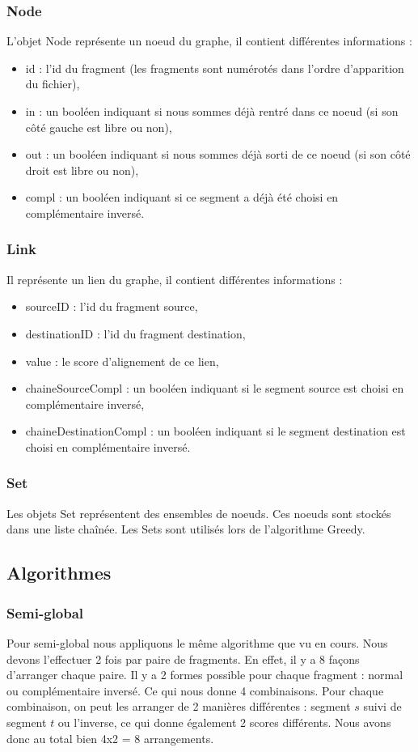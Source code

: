 \documentclass{article}
\begin{document}
\subsubsection{Node}
L'objet Node représente un noeud du graphe, il contient différentes informations :
\begin{itemize}
\item id : l'id du fragment (les fragments sont numérotés dans l'ordre d'apparition du fichier),
\item in : un booléen indiquant si nous sommes déjà rentré dans ce noeud (si son côté gauche est libre ou non),
\item out : un booléen indiquant si nous sommes déjà sorti de ce noeud (si son côté droit est libre ou non),
\item compl : un booléen indiquant si ce segment a déjà été choisi en complémentaire inversé.
\end{itemize}

\subsubsection{Link}
Il représente un lien du graphe, il contient différentes informations :
\begin{itemize}
\item sourceID : l'id du fragment source,
\item destinationID : l'id du fragment destination,
\item value : le score d'alignement de ce lien,
\item chaineSourceCompl : un booléen indiquant si le segment source est choisi en complémentaire inversé,
\item chaineDestinationCompl : un booléen indiquant si le segment destination est choisi en complémentaire inversé.
\end{itemize}

\subsubsection{Set}
Les objets Set représentent des ensembles de noeuds. Ces noeuds sont stockés dans une liste chaînée. Les Sets sont utilisés lors de l'algorithme Greedy.

\subsection{Algorithmes}
\subsubsection{Semi-global}
Pour semi-global nous appliquons le même algorithme que vu en cours. Nous devons l'effectuer 2 fois par paire de fragments. En effet, il y a 8 façons d'arranger chaque paire. Il y a 2 formes possible pour chaque fragment : normal ou complémentaire inversé. Ce qui nous donne 4 combinaisons. Pour chaque combinaison, on peut les arranger de 2 manières différentes : segment $s$ suivi de segment $t$ ou l'inverse, ce qui donne également 2 scores différents. Nous avons donc au total bien 4x2 = 8 arrangements. \\
\end{document}
